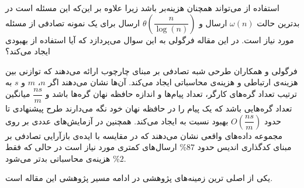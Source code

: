 \begin{enumerate}
استفاده از 
\icod
می‌تواند همچنان هزینه‌بر باشد زیرا علاوه بر این‌که این مسئله
\nphard
است در بدترین حالت
$\omega(n)$
ارسال و 
$\theta(\dfrac{n}{\log(n)})$
ارسال برای یک نمونه تصادفی از مسئله مورد نیاز است. در این مقاله فرگولی به این سوال می‌پردازد که آیا استفاده از 
\picod
بهبودی ایجاد می‌کند؟

فرگولی و همکاران طرحی شبه تصادفی بر مبنای چارچوب
\picod
ارائه می‌دهند که توازنی بین هزینه‌ی ارتباطی و هزینه‌ی محاسباتی ایجاد می‌کند. آن‌ها نشان می‌دهند اگر
$n$، $m$ و $s$
به ترتیب تعداد گره‌های کارگر، تعداد پیام‌ها و اندازه حافظه نهان گره‌ها باشد و
$\dfrac{ns}{m}$
میانگین تعداد گره‌هایی باشد که یک پیام را در حافظه نهان خود نگه می‌دارند طرح پیشنهادی تا حدود
$O(\dfrac{ns}{m})$
بهبود نسبت به 
\icod
ایجاد می‌کند. همچنین در آزمایش‌های عددی بر روی مجموعه داده‌های واقعی نشان می‌دهند که در مقایسه با ایده‌‌ی بازآرایی تصادفی بر مبنای کدگذاری اندیس حدود
$\%87$
ارسال‌های کمتری مورد نیاز است در حالی که فقط
$\%2$
هزینه‌ی محاسباتی بدتر می‌شود.

یکی از اصلی ترین زمینه‌های پژوهشی در
\picod
ادامه مسیر پژوهشی این مقاله است.
	
\end{enumerate}